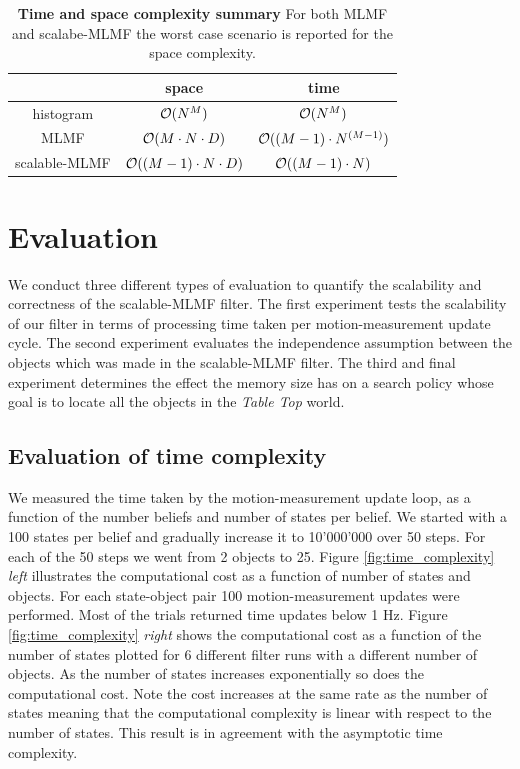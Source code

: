 \begin{table}
 \centering
 \begin{tabular}{c|c|c|}
	         &    space   &     time \\ \hline
   histogram     &    $\operatorname{\mathcal{O}}(N^M)$                                         &  $\operatorname{\mathcal{O}}(N^M)$ \\ \hline
   MLMF          &    $\operatorname{\mathcal{O}}(M \cdot N \cdot D)$          &  $\operatorname{\mathcal{O}}((M-1) \cdot N^{(M-1)})$ \\ \hline
   scalable-MLMF &    $\operatorname{\mathcal{O}}((M - 1) \cdot N \cdot D )$    &  $\operatorname{\mathcal{O}}((M-1) \cdot N)$ \\ \hline
   \end{tabular}
   \caption{\textbf{Time and space complexity summary} For both MLMF and scalabe-MLMF the worst case scenario is reported for the space complexity.}
   \label{tab:time_space_summary}
\end{table}


\section{Evaluation}\label{ch5:evaluation}

We conduct three different types of evaluation to quantify the scalability and correctness of the scalable-MLMF filter. The first experiment
tests the scalability of our filter in terms of processing time taken per motion-measurement update cycle. The second experiment evaluates the independence 
assumption between the objects which was made in the scalable-MLMF filter. The third and final experiment determines the effect the memory size has 
on a search policy whose goal is to locate all the objects in the \textit{Table Top} world.

\subsection{Evaluation of time complexity}

We measured the time taken by the motion-measurement update loop, as a function of the number beliefs and number of states per belief. 
We started with a 100 states per belief and gradually increase it to 10'000'000 over 50 steps. For each of the 50 steps we went from 2 objects to 25. Figure \ref{fig:time_complexity} \textit{left} illustrates the computational
cost as a function of number of states and objects. For each state-object pair 100 motion-measurement updates were performed. Most of the trials returned time updates 
below 1 Hz. Figure \ref{fig:time_complexity} \textit{right} shows the computational cost as a function of the number of states plotted for 6 different filter runs with
a different number of objects. As the number of states increases exponentially so does the computational cost. Note the cost increases at the same
rate as the number of states meaning that the computational complexity is linear with respect to the number of states. This result is in agreement with 
the asymptotic time complexity.

